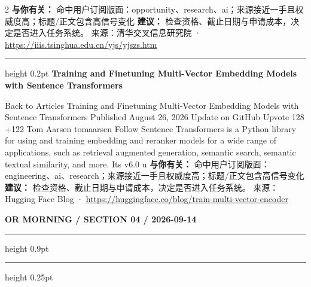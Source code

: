 \documentclass[10.5pt]{ctexart}
\begin{document}
\begin{multicols}{2}
\textbf{与你有关：} 命中用户订阅版面：opportunity、research、ai；来源接近一手且权威度高；标题/正文包含高信号变化
\textbf{建议：} 检查资格、截止日期与申请成本，决定是否进入任务系统。
{\footnotesize\color{ormuted} 来源：清华交叉信息研究院 · \url{https://iiis.tsinghua.edu.cn/yjs/yjszs.htm}}
\vspace{2mm}
\hrule height 0.2pt
\vspace{2mm}
{\large\bfseries Training and Finetuning Multi-Vector Embedding Models with Sentence Transformers}\par
Back to Articles Training and Finetuning Multi-Vector Embedding Models with Sentence Transformers Published August 26, 2026 Update on GitHub Upvote 128 +122 Tom Aarsen tomaarsen Follow Sentence Transformers is a Python library for using and training embedding and reranker models for a wide range of applications, such as retrieval augmented generation, semantic search, semantic textual similarity, and more. Its v6.0 u
\textbf{与你有关：} 命中用户订阅版面：engineering、ai、research；来源接近一手且权威度高；标题/正文包含高信号变化
\textbf{建议：} 检查资格、截止日期与申请成本，决定是否进入任务系统。
{\footnotesize\color{ormuted} 来源：Hugging Face Blog · \url{https://huggingface.co/blog/train-multi-vector-encoder}}
\end{multicols}
\newpage
{\small\bfseries OR MORNING / SECTION 04 / 2026-09-14}
\vspace{2mm}
\hrule height 0.9pt
\vspace{1.5mm}
\hrule height 0.25pt
\vspace{4mm}
\end{document}

